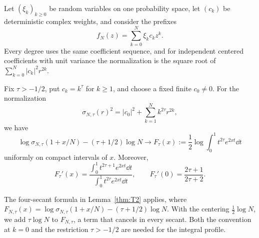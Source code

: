 Let $(\xi_k)_{k\geq0}$ be random variables on one probability space,
let $(c_k)$ be deterministic complex weights, and consider the prefixes
\[
 f_N(z)=\sum_{k=0}^N\xi_kc_kz^k.
\]
Every degree uses the same coefficient sequence, and for independent
centered coefficients with unit variance the normalization is the square
root of $\sum_{k=0}^N|c_k|^2r^{2k}$.

\begin{proposition}
\label{prop:weighted-log-variance-profile}
Fix $\tau>-1/2$, put $c_k=k^\tau$ for $k\geq1$,
and choose a fixed finite $c_0\ne0$. For the normalization
\[
 \sigma_{N,\tau}(r)^2=|c_0|^2+\sum_{k=1}^N k^{2\tau}r^{2k},
\]
we have
\[
 \log\sigma_{N,\tau}(1+x/N)-(\tau+1/2)\log N
 \longrightarrow F_\tau(x):=\frac12\log\int_0^1t^{2\tau}e^{2xt}\dd t
\]
uniformly on compact intervals of $x$. Moreover,
\[
 F_\tau'(x)=
 \frac{\int_0^1t^{2\tau+1}e^{2xt}\dd t}
      {\int_0^1t^{2\tau}e^{2xt}\dd t},
 \qquad F_\tau'(0)=\frac{2\tau+1}{2\tau+2}.
\]
\end{proposition}

The four-secant formula in Lemma~\ref{thm:T2} applies, where
$F_{N,\tau}(x)=\log\sigma_{N,\tau}(1+x/N)-(\tau+1/2)\log N$.
With the centering $\frac12\log N$, we add $\tau\log N$ to $F_{N,\tau}$,
a term that cancels in every secant. Both the convention at $k=0$ and the
restriction $\tau>-1/2$ are needed for the integral profile.

